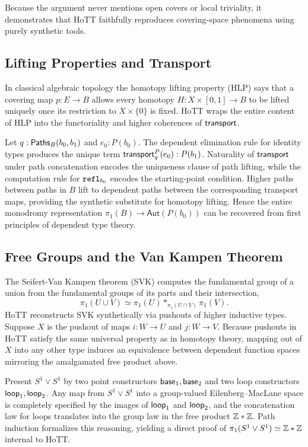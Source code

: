 Because the argument never mentions open covers or local triviality,
it demonstrates that HoTT faithfully reproduces covering-space
phenomena using purely synthetic tools.

\subsection{Lifting Properties and Transport}\label{sec:lifting}
In classical algebraic topology the homotopy lifting property (HLP)
says that a covering map \(p:E\to B\) allows every homotopy
\(H:X\times[0,1]\to B\) to be lifted uniquely once its restriction to
\(X\times\{0\}\) is fixed.  HoTT wraps the entire content of HLP into
the functoriality and higher coherences of \(\textsf{transport}\).

Let \(q:\textsf{Paths}_B(b_0,b_1)\) and \(e_0:P(b_0)\).
The dependent elimination rule for identity types produces the unique term \(\textsf{transport}^{P}_{q}(e_0):P(b_1)\).
Naturality of \(\textsf{transport}\) under path concatenation encodes the uniqueness clause of path lifting, 
while the computation rule for \(\texttt{refl}_{b_0}\) encodes the starting-point condition.
Higher paths between paths in \(B\) lift to dependent paths between the
corresponding transport maps, providing the synthetic substitute for
homotopy lifting.
Hence the entire monodromy representation
\(\pi_1(B)\to\mathsf{Aut}(P(b_0))\) can be recovered from first
principles of dependent type theory.

\subsection{Free Groups and the Van Kampen Theorem}\label{sec:vankampen}
The Seifert-Van Kampen theorem (SVK) computes the fundamental group of
a union from the fundamental groups of its parts and their
intersection,
\[
  \pi_1(U\cup V)\simeq\pi_1(U)*_{\pi_1(U\cap V)}\pi_1(V).
\]
HoTT reconstructs SVK synthetically via pushouts of higher inductive
types.  Suppose \(X\) is the pushout of maps \(i:W\to U\) and
\(j:W\to V\).  Because pushouts in HoTT satisfy the same universal
property as in homotopy theory, mapping out of \(X\) into any other
type induces an equivalence between dependent function spaces
mirroring the amalgamated free product above.

\begin{example}
  Present \(S^1\vee S^1\) by two point constructors
  \(\textsf{base}_1,\textsf{base}_2\) and two loop constructors \(\textsf{loop}_1,\textsf{loop}_2\).
  Any map from \(S^1\vee S^1\) into a group-valued Eilenberg–MacLane
  space is completely specified by the images of \(\textsf{loop}_1\) and
  \(\textsf{loop}_2\), and the concatenation law for loops translates into the
  group law in the free product \(\mathbb{Z}*\mathbb{Z}\).  Path induction formalizes
  this reasoning, yielding a direct proof of
  \(\pi_1(S^1\vee S^1)\simeq\mathbb{Z}*\mathbb{Z}\) internal to HoTT.
\end{example}

